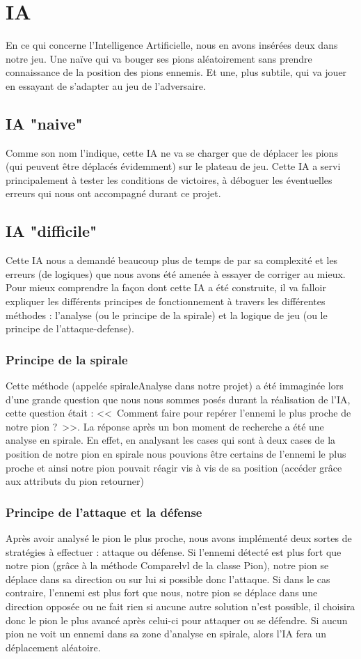 \documentclass[10pt]{article}
\begin{document}
\section{IA}
 En ce qui concerne l'Intelligence Artificielle, nous en avons insérées deux dans notre jeu. Une naïve qui va bouger ses pions aléatoirement sans prendre connaissance de la position des pions ennemis. Et une, plus subtile, qui va jouer en essayant de s'adapter au jeu de l'adversaire.
\subsection{IA "naive"}

Comme son nom l'indique, cette IA ne va se charger que de déplacer les pions (qui peuvent être déplacés évidemment) sur le plateau de jeu.
Cette IA a servi principalement à tester les conditions de victoires, à déboguer les éventuelles erreurs qui nous ont accompagné durant ce projet.

\subsection {IA "difficile"}
Cette IA nous a demandé beaucoup plus de temps de par sa complexité et les erreurs (de logiques) que nous avons été amenée à essayer de corriger au mieux. Pour mieux comprendre la façon dont cette IA a été construite, il va falloir expliquer les différents principes de fonctionnement à travers les différentes méthodes : l'analyse (ou le principe de la spirale) et la logique de jeu (ou le principe de l'attaque-defense).

\subsubsection {Principe de la spirale}
Cette méthode (appelée spiraleAnalyse dans notre projet) a été immaginée lors d'une grande question que nous nous sommes posés durant la réalisation de l'IA, cette question était : <<~Comment faire pour repérer l'ennemi le plus proche de notre pion ?~>>. La réponse après un bon moment de recherche a été une analyse en spirale. En effet, en analysant les cases qui sont à deux cases de la position de notre pion en spirale nous pouvions être certains de l'ennemi le plus proche et ainsi notre pion pouvait réagir vis à vis de sa position (accéder grâce aux attributs du pion retourner)  
\subsubsection {Principe de l'attaque et la défense}
Après avoir analysé le pion le plus proche, nous avons implémenté deux sortes de stratégies à effectuer : attaque ou défense. Si l'ennemi détecté est plus fort que notre pion (grâce à la méthode Comparelvl de la classe Pion), notre pion se déplace dans sa direction ou sur lui si possible donc l'attaque. Si dans le cas contraire, l'ennemi est plus fort que nous, notre pion se déplace dans une direction opposée ou ne fait rien si aucune autre solution n'est possible, il choisira donc le pion le plus avancé après celui-ci pour attaquer ou se défendre.
Si aucun pion ne voit un ennemi dans sa zone d'analyse en spirale, alors l'IA fera un déplacement aléatoire.
\end{document}
